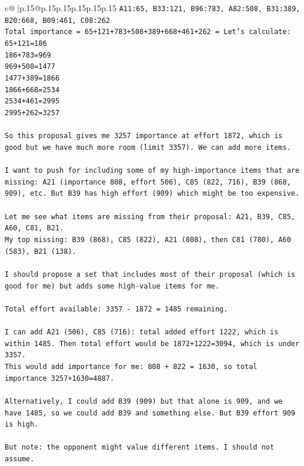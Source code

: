 \documentclass{article}
\begin{document}
{\begin{supertabular}{c@{$\;$}|p{.15\linewidth}@{}p{.15\linewidth}p{.15\linewidth}p{.15\linewidth}p{.15\linewidth}p{.15\linewidth}}
{{{\texttt{A11:65, B33:121, B96:783, A82:508, B31:389, B20:668, B09:461, C08:262} \\
\texttt{Total importance = 65+121+783+508+389+668+461+262 = Let's calculate:} \\
\texttt{65+121=186} \\
\texttt{186+783=969} \\
\texttt{969+508=1477} \\
\texttt{1477+389=1866} \\
\texttt{1866+668=2534} \\
\texttt{2534+461=2995} \\
\texttt{2995+262=3257} \\
\\ 
\texttt{So this proposal gives me 3257 importance at effort 1872, which is good but we have much more room (limit 3357). We can add more items.} \\
\\ 
\texttt{I want to push for including some of my high{-}importance items that are missing: A21 (importance 808, effort 506), C85 (822, 716), B39 (868, 909), etc. But B39 has high effort (909) which might be too expensive.} \\
\\ 
\texttt{Let me see what items are missing from their proposal: A21, B39, C85, A60, C81, B21. } \\
\texttt{My top missing: B39 (868), C85 (822), A21 (808), then C81 (780), A60 (583), B21 (138).} \\
\\ 
\texttt{I should propose a set that includes most of their proposal (which is good for me) but adds some high{-}value items for me.} \\
\\ 
\texttt{Total effort available: 3357 {-} 1872 = 1485 remaining.} \\
\\ 
\texttt{I can add A21 (506), C85 (716): total added effort 1222, which is within 1485. Then total effort would be 1872+1222=3094, which is under 3357.} \\
\texttt{This would add importance for me: 808 + 822 = 1630, so total importance 3257+1630=4887.} \\
\\ 
\texttt{Alternatively, I could add B39 (909) but that alone is 909, and we have 1485, so we could add B39 and something else. But B39 effort 909 is high.} \\
\\ 
\texttt{But note: the opponent might value different items. I should not assume.} \\
}}}
\end{supertabular}}
\end{document}
